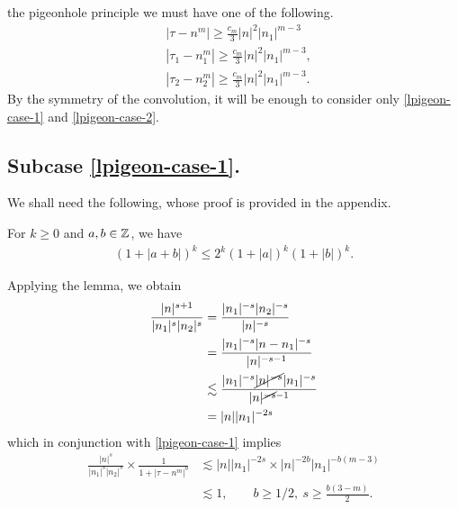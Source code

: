the pigeonhole principle we must have one of the 
following.
%
%
\begin{align}
	\label{lpigeon-case-1}
	& |\tau - n^{m }| \ge \frac{c_m}{3} |n|^2 | n_1 |^{m-3} 		\\
		\label{lpigeon-case-2}
	    & | \tau_1 - n_1^{m } | \ge \frac{c_m}{3} |n|^2 | n_1 |^{m-3} ,  
		\\
		\label{lpigeon-case-3}
		& | \tau_2 - n_2^{m } | \ge
		\frac{c_m}{3} |n|^2 | n_1 |^{m-3}.  
\end{align}
%
%
By the symmetry of the convolution, it will be enough to consider only
\eqref{lpigeon-case-1} and \eqref{lpigeon-case-2}.
%
%
%
\subsection{Subcase \eqref{lpigeon-case-1}.} 
We shall need the following, whose proof is provided in the appendix.
%
%
\begin{lemma}
\label{llem:splitting}
	For $k \ge 0$ and $a, b \in {\mathbb{Z}}$, we have
%
%
\begin{equation}
	\label{lsplitting}
	\begin{split}
		\left ( 1 + |a +b | \right)^k \le 2^k \left(1 + | a | \right)^k \left(
		1 + | b | \right)^k.
	\end{split}
\end{equation}
%
%
\end{lemma}
%
Applying the lemma, we obtain
%
%
%
\begin{equation*}
	\begin{split}
		\frac{|n|^{s+1}}{|n_1|^s | n_2|^s } 
		& =\frac{|n_1|^{-s} |n_2|^{-s}
		}{|n|^{-s}}
		\\
		& = \frac{| n_1|^{-s} | n - n_1 |^{-s} }{ | n|^{-s-1}} 
		\\
		& \lesssim \frac{|n_1|^{-s} \cancel{|n|^{-s} }|n_1 |
		^{-s}}{ |n|
		^{\cancel{-s}-1}}
		\\
		& = |n| | n_1 |^{-2s}
	\end{split}
\end{equation*}
%
which in conjunction with \eqref{lpigeon-case-1} implies
%
\begin{equation}
	\label{lconvo-deriv-bound}
	\begin{split}
		\frac{|n|^s}{|n_1|^s 
		| n_2|^s}
		\times
		\frac{1}{1 + | \tau -n^{m} |^{b}}
		& \lesssim  |n| |n_{1} |^{-2s} \times |n|^{-2b} |n_{1}|^{-b(m-3)} 
		\\
		& \lesssim 1, \qquad b\ge 1/2, \ s \ge \frac{b(3-m)}{2}.
	\end{split}  
\end{equation}
